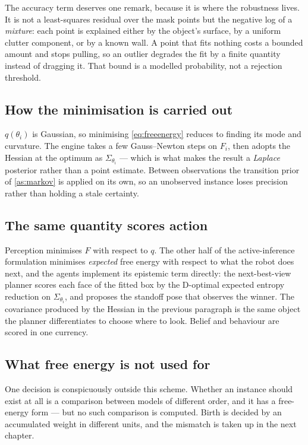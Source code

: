\documentclass[11pt,a4paper]{report}
\theoremstyle{definition}   %
\begin{document}
The accuracy term deserves one remark, because it is where the robustness lives. It is not a
least-squares residual over the mask points but the negative log of a \emph{mixture}: each point is
explained either by the object's surface, by a uniform clutter component, or by a known wall. A
point that fits nothing costs a bounded amount and stops pulling, so an outlier degrades the fit by
a finite quantity instead of dragging it. That bound is a modelled probability, not a rejection
threshold.

\subsection{How the minimisation is carried out}

$q(\theta_i)$ is Gaussian, so minimising \eqref{eq:freeenergy} reduces to finding its mode and
curvature. The engine takes a few Gauss--Newton steps on $F_i$, then adopts the Hessian at the
optimum as $\Sigma_{\theta_i}$ --- which is what makes the result a \emph{Laplace} posterior rather
than a point estimate. Between observations the transition prior of \ref{as:markov} is applied on
its own, so an unobserved instance loses precision rather than holding a stale certainty.

\subsection{The same quantity scores action}

Perception minimises $F$ with respect to $q$. The other half of the active-inference formulation
minimises \emph{expected} free energy with respect to what the robot does next, and the agents
implement its epistemic term directly: the next-best-view planner scores each face of the fitted
box by the D-optimal expected entropy reduction on $\Sigma_{\theta_i}$, and proposes the standoff
pose that observes the winner. The covariance produced by the Hessian in the previous paragraph is
the same object the planner differentiates to choose where to look. Belief and behaviour are scored
in one currency.

\subsection{What free energy is not used for}

One decision is conspicuously outside this scheme. Whether an instance should exist at all is a
comparison between models of different order, and it has a free-energy form --- but no such
comparison is computed. Birth is decided by an accumulated weight in different units, and the
mismatch is taken up in the next chapter.
\end{document}
